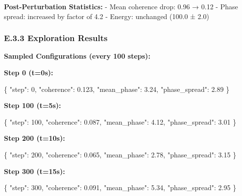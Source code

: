\documentclass[
]{article}
\newenvironment{Shaded}{}{}
\newcommand{\DataTypeTok}[1]{\textcolor[rgb]{0.56,0.13,0.00}{#1}}
\newcommand{\DecValTok}[1]{\textcolor[rgb]{0.25,0.63,0.44}{#1}}
\newcommand{\FloatTok}[1]{\textcolor[rgb]{0.25,0.63,0.44}{#1}}
\newcommand{\FunctionTok}[1]{\textcolor[rgb]{0.02,0.16,0.49}{#1}}
\begin{document}
\textbf{Post-Perturbation Statistics:} - Mean coherence drop: 0.96 →
0.12 - Phase spread: increased by factor of 4.2 - Energy: unchanged
(100.0 ± 2.0)

\subsubsection{E.3.3 Exploration
Results}\label{e.3.3-exploration-results}

\textbf{Sampled Configurations (every 100 steps):}

\textbf{Step 0 (t=0s):}

\begin{Shaded}
\begin{Highlighting}[]
\FunctionTok{\{}
  \DataTypeTok{"step"}\FunctionTok{:} \DecValTok{0}\FunctionTok{,}
  \DataTypeTok{"coherence"}\FunctionTok{:} \FloatTok{0.123}\FunctionTok{,}
  \DataTypeTok{"mean\_phase"}\FunctionTok{:} \FloatTok{3.24}\FunctionTok{,}
  \DataTypeTok{"phase\_spread"}\FunctionTok{:} \FloatTok{2.89}
\FunctionTok{\}}
\end{Highlighting}
\end{Shaded}

\textbf{Step 100 (t=5s):}

\begin{Shaded}
\begin{Highlighting}[]
\FunctionTok{\{}
  \DataTypeTok{"step"}\FunctionTok{:} \DecValTok{100}\FunctionTok{,}
  \DataTypeTok{"coherence"}\FunctionTok{:} \FloatTok{0.087}\FunctionTok{,}
  \DataTypeTok{"mean\_phase"}\FunctionTok{:} \FloatTok{4.12}\FunctionTok{,}
  \DataTypeTok{"phase\_spread"}\FunctionTok{:} \FloatTok{3.01}
\FunctionTok{\}}
\end{Highlighting}
\end{Shaded}

\textbf{Step 200 (t=10s):}

\begin{Shaded}
\begin{Highlighting}[]
\FunctionTok{\{}
  \DataTypeTok{"step"}\FunctionTok{:} \DecValTok{200}\FunctionTok{,}
  \DataTypeTok{"coherence"}\FunctionTok{:} \FloatTok{0.065}\FunctionTok{,}
  \DataTypeTok{"mean\_phase"}\FunctionTok{:} \FloatTok{2.78}\FunctionTok{,}
  \DataTypeTok{"phase\_spread"}\FunctionTok{:} \FloatTok{3.15}
\FunctionTok{\}}
\end{Highlighting}
\end{Shaded}

\textbf{Step 300 (t=15s):}

\begin{Shaded}
\begin{Highlighting}[]
\FunctionTok{\{}
  \DataTypeTok{"step"}\FunctionTok{:} \DecValTok{300}\FunctionTok{,}
  \DataTypeTok{"coherence"}\FunctionTok{:} \FloatTok{0.091}\FunctionTok{,}
  \DataTypeTok{"mean\_phase"}\FunctionTok{:} \FloatTok{5.34}\FunctionTok{,}
  \DataTypeTok{"phase\_spread"}\FunctionTok{:} \FloatTok{2.95}
\FunctionTok{\}}
\end{Highlighting}
\end{Shaded}
\end{document}
